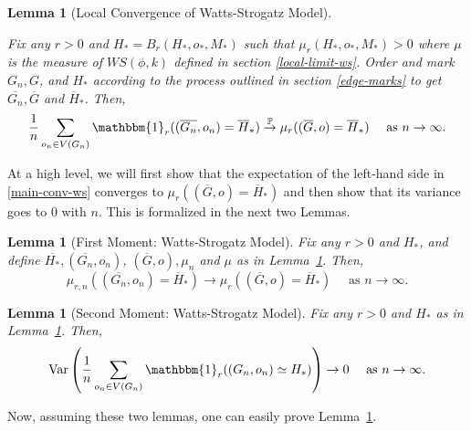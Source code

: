 \documentclass[10pt]{amsart}
\newtheorem{lemma}[theorem]{Lemma}
\begin{document}
\begin{lemma} [Local Convergence of Watts-Strogatz Model]  \label{main-lemma-ws} 

Fix any $r > 0$ and $H_* = B_r(H_*, o_*, M_*)$ such that $\mu_r(H_*, o_*, M_*)>0$ where $\mu$ is the measure of $WS(\phi, k)$ defined in section \ref{local-limit-ws}. Order and mark $G_n, G$, and $H_*$ according to the process outlined in section \ref{edge-marks} to get $\overline{G_n}, \overline{G}$ and $\overline{H}_*$. Then,
\begin{equation} \label{main-conv-ws}
    \frac{1}{n}\sum_{o_n\in V(G_n)}  \mathbbm{1}_r((\overline{G_n},o_n) = \overline{H}_* )\overset{\mathbb P}{\to}\mu_r((\overline{G},o) =  \overline{H}_*) \quad \text{ as $n \to \infty$.}
\end{equation}  
\end{lemma}

At a high level, we will first show that the expectation of the left-hand side in \eqref{main-conv-ws} converges to $\mu_r((\overline{G},o) =  \overline{H}_*)$ and then show that its variance goes to $0$ with $n$. This is formalized in the next two Lemmas. 

\begin{lemma}[First Moment: Watts-Strogatz Model] \label{ws-1moment} Fix any $r>0$ and $H_*$, and define $\overline{H_*}, (\overline{G_n}, o_n)$, $(\overline{G}, o), \mu_n$ and $\mu$ as in Lemma~\ref{main-lemma-ws}. Then,
\begin{equation*} 
\mu_{r,n}((\overline{G_n},o_n) = \overline{H}_*) \to \mu_{r}((\overline{G},o) = \overline{H}_*) \quad \text{ as $n \to \infty$.}
\end{equation*}
\end{lemma}

\begin{lemma}[Second Moment: Watts-Strogatz Model] \label{ws-2moment} Fix any $r>0$ and $H_*$ as in Lemma~\ref{main-lemma-ws}. Then,
\begin{equation*} 
\text{Var}\left(\frac{1}{n}\sum_{o_n\in V(G_n)}  \mathbbm{1}_r((G_n,o_n)\simeq H_*) \right) \to 0 \quad \text{ as $n \to \infty$.}
\end{equation*}
\end{lemma}

Now, assuming these two lemmas, one can easily prove Lemma~\ref{main-lemma-ws}.
\end{document}
